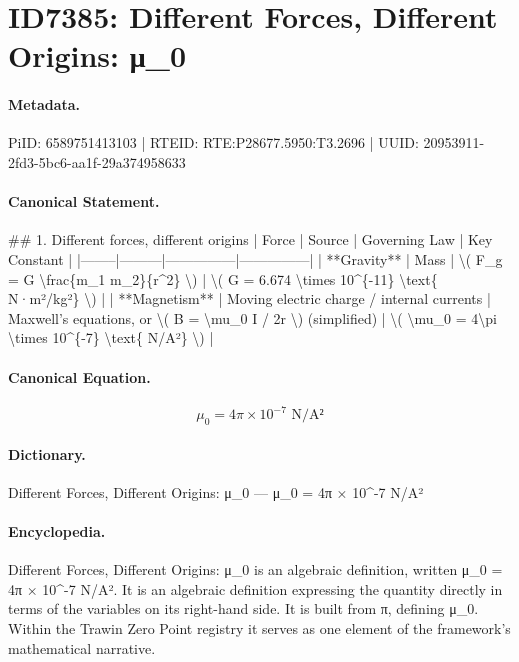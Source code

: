 \section*{ID7385: Different Forces, Different Origins: μ\_0}
\paragraph{Metadata.}
PiID: 6589751413103 | RTEID: RTE:P28677.5950:T3.2696 | UUID: 20953911-2fd3-5bc6-aa1f-29a374958633

\paragraph{Canonical Statement.}
\#\# 1. Different forces, different origins | Force | Source | Governing Law | Key Constant | |--------|---------|---------------|---------------| | **Gravity** | Mass | \textbackslash{}( F\_g = G \textbackslash{}frac\{m\_1 m\_2\}\{r\textasciicircum{}2\} \textbackslash{}) | \textbackslash{}( G = 6.674 \textbackslash{}times 10\textasciicircum{}\{-11\} \textbackslash{}text\{ N·m²/kg²\} \textbackslash{}) | | **Magnetism** | Moving electric charge / internal currents | Maxwell’s equations, or \textbackslash{}( B = \textbackslash{}mu\_0 I / 2r \textbackslash{}) (simplified) | \textbackslash{}( \textbackslash{}mu\_0 = 4\textbackslash{}pi \textbackslash{}times 10\textasciicircum{}\{-7\} \textbackslash{}text\{ N/A²\} \textbackslash{}) |

\paragraph{Canonical Equation.}
\[
\mu_0 = 4\pi \times 10^{-7} \text{ N/A²}
\]

\paragraph{Dictionary.}
Different Forces, Different Origins: μ\_0 — μ\_0 = 4π × 10\textasciicircum{}-7 N/A²

\paragraph{Encyclopedia.}
Different Forces, Different Origins: μ\_0 is an algebraic definition, written μ\_0 = 4π × 10\textasciicircum{}-7 N/A². It is an algebraic definition expressing the quantity directly in terms of the variables on its right-hand side. It is built from π, defining μ\_0. Within the Trawin Zero Point registry it serves as one element of the framework's mathematical narrative.
